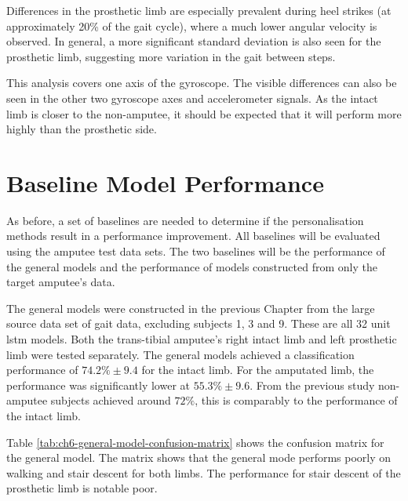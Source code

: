 Differences in the prosthetic limb are especially prevalent during heel strikes (at approximately 20\% of the gait cycle), where a much lower angular velocity is observed. In general, a more significant standard deviation is also seen for the prosthetic limb, suggesting more variation in the gait between steps.

This analysis covers one axis of the gyroscope. The visible differences can also be seen in the other two gyroscope axes and accelerometer signals. As the intact limb is closer to the non-amputee, it should be expected that it will perform more highly than the prosthetic side.

\section{Baseline Model Performance}
\label{sec:amputee-baseline}
As before, a set of baselines are needed to determine if the personalisation methods result in a performance improvement. All baselines will be evaluated using the amputee test data sets. The two baselines will be the performance of the general models and the performance of models constructed from only the target amputee's data.

The general models were constructed in the previous Chapter from the large source data set of gait data, excluding subjects 1, 3 and 9. These are all 32 unit \acrshort{lstm} models. Both the trans-tibial amputee's right intact limb and left prosthetic limb were tested separately. The general models achieved a classification performance of $74.2\%\pm9.4$ for the intact limb. For the amputated limb, the performance was significantly lower at $55.3\%\pm9.6$. From the previous study non-amputee subjects achieved around $72\%$, this is comparably to the performance of the intact limb.

Table \ref{tab:ch6-general-model-confusion-matrix} shows the confusion matrix for the general model. The matrix shows that the general mode performs poorly on walking and stair descent for both limbs. The performance for stair descent of the prosthetic limb is notable poor.

